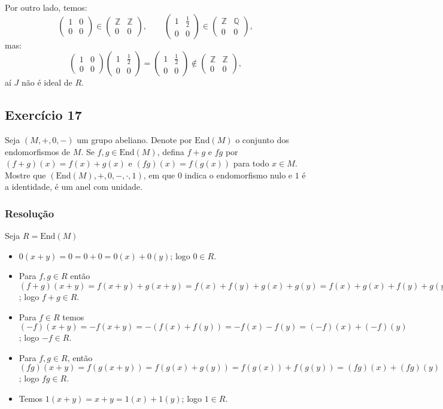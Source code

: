 \documentclass[10pt,a4paper]{article}
\begin{document}
\medskip
\noindent
Por outro lado, temos:
\[
\begin{pmatrix}
1&0\\0&0
\end{pmatrix}\in\begin{pmatrix}
\mathbb{Z}&\mathbb{Z}\\0&0
\end{pmatrix},\quad\quad\begin{pmatrix}
1&\frac{1}{2}\\0&0
\end{pmatrix}\in\begin{pmatrix}
\mathbb{Z}&\mathbb{Q}\\0&0
\end{pmatrix},
\]
mas:
\[
\begin{pmatrix}
1&0\\0&0
\end{pmatrix}\begin{pmatrix}
1&\frac{1}{2}\\0&0
\end{pmatrix}=\begin{pmatrix}
1&\frac{1}{2}\\0&0
\end{pmatrix}\notin\begin{pmatrix}
\mathbb{Z}&\mathbb{Z}\\0&0
\end{pmatrix},
\]
aí $J$ não é ideal de $R$.

\subsection*{Exercício 17}

Seja $(M,+,0,-)$ um grupo abeliano. Denote por $\mathrm{End}(M)$ o conjunto dos endomorfismos de $M$. Se $f,g\in\mathrm{End}(M)$, defina $f+g$ e $fg$ por $(f+g)(x)=f(x)+g(x)$ e $(fg)(x)=f(g(x))$ para todo $x\in M$. Mostre que $(\mathrm{End}(M),+,0,-,\cdot,1)$, em que $0$ indica o endomorfismo nulo e $1$ é a identidade, é um anel com unidade.

\subsubsection*{Resolução}

Seja $R=\mathrm{End}(M)$

\begin{itemize}
\item $0(x+y)=0=0+0=0(x)+0(y)$; logo $0\in R$.
\item Para $f,g\in R$ então $(f+g)(x+y)=f(x+y)+g(x+y)=f(x)+f(y)+g(x)+g(y)=f(x)+g(x)+f(y)+g(y)=(f+g)(x)+(f+g)(y)$; logo $f+g\in R$.
\item Para $f\in R$ temos $(-f)(x+y)=-f(x+y)=-(f(x)+f(y))=-f(x)-f(y)=(-f)(x)+(-f)(y)$; logo $-f\in R$.
\item Para $f,g\in R$, então $(fg)(x+y)=f(g(x+y))=f(g(x)+g(y))=f(g(x))+f(g(y))=(fg)(x)+(fg)(y)$; logo $fg\in R$.
\item Temos $1(x+y)=x+y=1(x)+1(y)$; logo $1\in R$.
\end{itemize}
\end{document}
